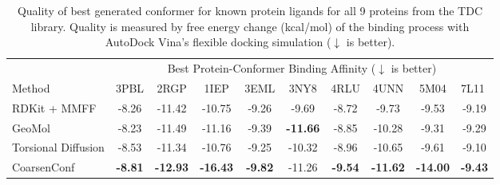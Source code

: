\begin{table}[t]%
\begin{center}
\caption{Quality of best generated conformer for known protein ligands for all 9 proteins from the TDC library. Quality is measured by free energy change (kcal/mol) of the binding process with AutoDock Vina's flexible docking simulation ($\downarrow$ is better).
}
\label{tab:results_oracle}
\begin{tabular}{l|ccccccccc}
\toprule
                    & \multicolumn{9}{c}{Best Protein-Conformer Binding Affinity ($\downarrow$ is better)}                                                                                                                   \\
Method              & 3PBL           & 2RGP            & 1IEP            & 3EML           & 3NY8            & 4RLU & 4UNN            & 5M04            & \multicolumn{1}{l}{7L11}          \\ \hline
RDKit + MMFF       & -8.26          & -11.42          & -10.75          & -9.26          & -9.69           &   -8.72   & -9.73           & -9.53           & -9.19                             \\
GeoMol              & -8.23          & -11.49          & -11.16          & -9.39          & \textbf{-11.66} &  -8.85    & -10.28          & -9.31           & -9.29                             \\
Torsional Diffusion & -8.53          & -11.34          & -10.76          & -9.25          & -10.32          &   -8.96   & -10.65          & -9.61           & -9.10                             \\
CoarsenConf       & \textbf{-8.81} & \textbf{-12.93} & \textbf{-16.43} & \textbf{-9.82} & -11.26          &   \textbf{-9.54}   & \textbf{-11.62} & \textbf{-14.00} & \textbf{-9.43}                    \\ \hline
\end{tabular}
\end{center}
\end{table}
